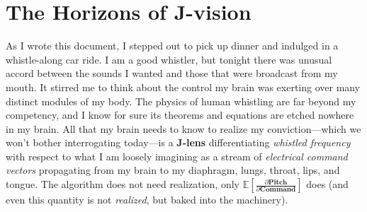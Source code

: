 \documentclass{article}
\newcommand{\jspace}{\mathscr{S}}
\begin{document}


\section{The Horizons of J-vision}

As I wrote this document, I stepped out to pick up dinner and indulged in a whistle-along car ride. I am a good whistler, but tonight there was unusual accord between the sounds I wanted and those that were broadcast from my mouth. It stirred me to think about the control my brain was exerting over many distinct modules of my body. The physics of human whistling are far beyond my competency, and I know for sure its theorems and equations are etched nowhere in my brain. All that my brain needs to know to realize my conviction---which we won't bother interrogating today---is a \textbf{J-lens} differentiating \textit{whistled frequency} with respect to what I am loosely imagining as a stream of \textit{electrical command vectors} propagating from my brain to my diaphragm, lungs, throat, lips, and tongue. The algorithm does not need realization, only \(\mathbb{E} [\frac {\partial \mathbf{Pitch}}  {\partial \mathbf{Command}}]\) does (and even this quantity is not \textit{realized}, but baked into the machinery).
\end{document}
